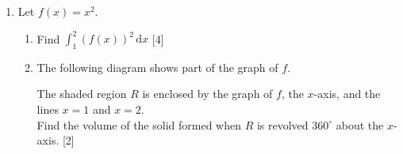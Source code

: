 \documentclass[12pt, twoside]{article}
\begin{document}
\begin{enumerate}
\item Let $f(x)=x^2$.
  \begin{enumerate}
    \item Find $\int_1^2 (f(x))^2 \,\mathrm{d}x$ \hfill [4]
    \item The following diagram shows part of the graph of $f$.
      \begin{center}
      \end{center}
    The shaded region $R$ is enclosed by the graph of $f$, the $x$-axis, and the lines $x=1$ and $x=2$.\\
    Find the volume of the solid formed when $R$ is revolved $360^\circ$ about the $x$-axis.  \hfill [2]
  \end{enumerate}

\end{enumerate}
\end{document}
